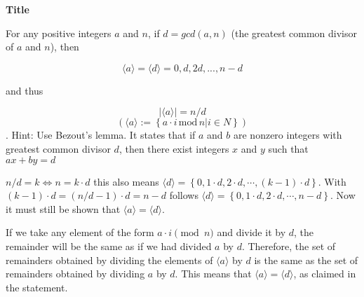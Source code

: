 \question \textbf{Title}

For any positive integers $a$ and $n$, if $d = gcd(a, n)$ (the greatest common divisor of $a$ and $n$),
then

$$ \langle a \rangle  = \langle d \rangle  = {0, d, 2d, . . . , n − d}$$

and thus

$$|\langle a \rangle | = n/d$$
$$(\langle a \rangle  := \left\{a \cdot i\,\text{mod}\,n | i \in N\right\})$$.
Hint: Use Bezout’s lemma. It states that if $a$ and $b$ are nonzero integers with greatest common divisor $d$, then there exist integers $x$ and $y$ such that $ax + by = d$


\begin{solution}
$n/d = k \Leftrightarrow n = k\cdot d$ this also means $\langle d \rangle = \left\{0, 1\cdot d, 2\cdot d,\cdots, (k-1)\cdot d\right\}$. With $(k-1)\cdot d=(n/d-1)\cdot d=n-d$ follows $\langle d \rangle = \left\{0, 1\cdot d, 2\cdot d,\cdots, n-d\right\}$. Now it must still be shown that $\langle a \rangle  = \langle d \rangle$.

If we take any element of the form $a \cdot i \pmod{n}$ and divide it by $d$, the remainder will be the same as if we had divided $a$ by $d$. Therefore, the set of remainders obtained by dividing the elements of $\langle a \rangle$ by $d$ is the same as the set of remainders obtained by dividing $a$ by $d$. This means that $\langle a \rangle = \langle d \rangle$, as claimed in the statement.

\end{solution}
